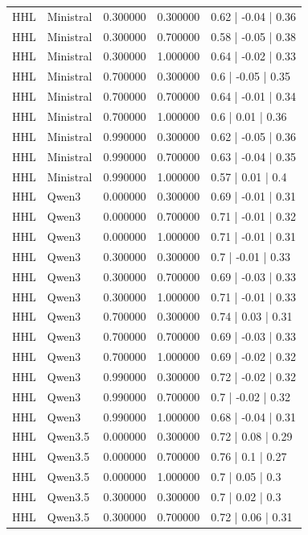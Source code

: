 \begin{longtable}{lllll}
HHL & Ministral & 0.300000 & 0.300000 & 0.62 | -0.04 | 0.36 \\
HHL & Ministral & 0.300000 & 0.700000 & 0.58 | -0.05 | 0.38 \\
HHL & Ministral & 0.300000 & 1.000000 & 0.64 | -0.02 | 0.33 \\
HHL & Ministral & 0.700000 & 0.300000 & 0.6 | -0.05 | 0.35 \\
HHL & Ministral & 0.700000 & 0.700000 & 0.64 | -0.01 | 0.34 \\
HHL & Ministral & 0.700000 & 1.000000 & 0.6 | 0.01 | 0.36 \\
HHL & Ministral & 0.990000 & 0.300000 & 0.62 | -0.05 | 0.36 \\
HHL & Ministral & 0.990000 & 0.700000 & 0.63 | -0.04 | 0.35 \\
HHL & Ministral & 0.990000 & 1.000000 & 0.57 | 0.01 | 0.4 \\
HHL & Qwen3 & 0.000000 & 0.300000 & 0.69 | -0.01 | 0.31 \\
HHL & Qwen3 & 0.000000 & 0.700000 & 0.71 | -0.01 | 0.32 \\
HHL & Qwen3 & 0.000000 & 1.000000 & 0.71 | -0.01 | 0.31 \\
HHL & Qwen3 & 0.300000 & 0.300000 & 0.7 | -0.01 | 0.33 \\
HHL & Qwen3 & 0.300000 & 0.700000 & 0.69 | -0.03 | 0.33 \\
HHL & Qwen3 & 0.300000 & 1.000000 & 0.71 | -0.01 | 0.33 \\
HHL & Qwen3 & 0.700000 & 0.300000 & 0.74 | 0.03 | 0.31 \\
HHL & Qwen3 & 0.700000 & 0.700000 & 0.69 | -0.03 | 0.33 \\
HHL & Qwen3 & 0.700000 & 1.000000 & 0.69 | -0.02 | 0.32 \\
HHL & Qwen3 & 0.990000 & 0.300000 & 0.72 | -0.02 | 0.32 \\
HHL & Qwen3 & 0.990000 & 0.700000 & 0.7 | -0.02 | 0.32 \\
HHL & Qwen3 & 0.990000 & 1.000000 & 0.68 | -0.04 | 0.31 \\
HHL & Qwen3.5 & 0.000000 & 0.300000 & 0.72 | 0.08 | 0.29 \\
HHL & Qwen3.5 & 0.000000 & 0.700000 & 0.76 | 0.1 | 0.27 \\
HHL & Qwen3.5 & 0.000000 & 1.000000 & 0.7 | 0.05 | 0.3 \\
HHL & Qwen3.5 & 0.300000 & 0.300000 & 0.7 | 0.02 | 0.3 \\
HHL & Qwen3.5 & 0.300000 & 0.700000 & 0.72 | 0.06 | 0.31 \\

\end{longtable}

